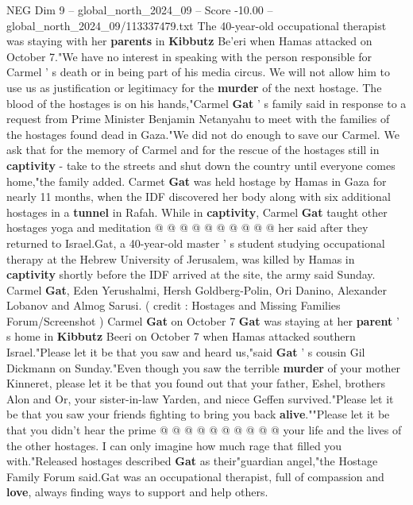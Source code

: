 \begin{textsample}{NEG Dim 9 – global\_north\_2024\_09 – Score -10.00 – global\_north\_2024\_09/113337479.txt}  \label{ex:f9_neg_014}
The 40-year-old occupational therapist was staying with her \textbf{parents} in \textbf{Kibbutz} Be'eri when Hamas attacked on October 7."We have no interest in speaking with the person responsible for Carmel ' s death or in being part of his media circus.
We will not allow him to use us as justification or legitimacy for the \textbf{murder} of the next hostage.
The blood of the hostages is on his hands,"Carmel \textbf{Gat} ' s family said in response to a request from Prime Minister Benjamin Netanyahu to meet with the families of the hostages found dead in Gaza."We did not do enough to save our Carmel.
We ask that for the memory of Carmel and for the rescue of the hostages still in \textbf{captivity} - take to the streets and shut down the country until everyone comes home,"the family added.
Carmet \textbf{Gat} was held hostage by Hamas in Gaza for nearly 11 months, when the IDF discovered her body along with six additional hostages in a \textbf{tunnel} in Rafah.
While in \textbf{captivity}, Carmel \textbf{Gat} taught other hostages yoga and meditation @ @ @ @ @ @ @ @ @ @ her said after they returned to Israel.Gat, a 40-year-old master ' s student studying occupational therapy at the Hebrew University of Jerusalem, was killed by Hamas in \textbf{captivity} shortly before the IDF arrived at the site, the army said Sunday.
Carmel \textbf{Gat}, Eden Yerushalmi, Hersh Goldberg-Polin, Ori Danino, Alexander Lobanov and Almog Sarusi. ( credit : Hostages and Missing Families Forum/Screenshot ) Carmel \textbf{Gat} on October 7 \textbf{Gat} was staying at her \textbf{parent} ' s home in \textbf{Kibbutz} Beeri on October 7 when Hamas attacked southern Israel."Please let it be that you saw and heard us,"said \textbf{Gat} ' s cousin Gil Dickmann on Sunday."Even though you saw the terrible \textbf{murder} of your mother Kinneret, please let it be that you found out that your father, Eshel, brothers Alon and Or, your sister-in-law Yarden, and niece Geffen survived."Please let it be that you saw your friends fighting to bring you back \textbf{alive}.""Please let it be that you didn't hear the prime @ @ @ @ @ @ @ @ @ @ your life and the lives of the other hostages.
I can only imagine how much rage that filled you with."Released hostages described \textbf{Gat} as their"guardian angel,"the Hostage Family Forum said.Gat was an occupational therapist, full of compassion and \textbf{love}, always finding ways to support and help others.

\end{textsample}
